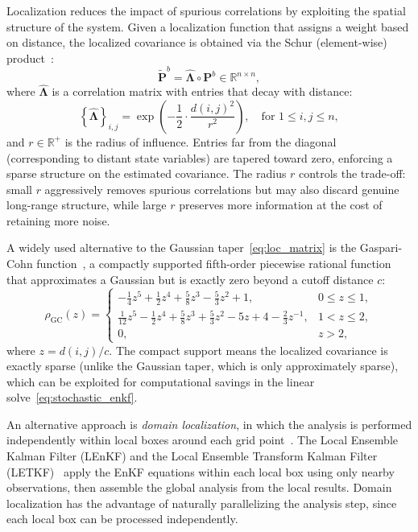 Localization reduces the impact of spurious correlations by exploiting the spatial structure of the system. Given a localization function that assigns a weight based on distance, the localized covariance is obtained via the Schur (element-wise) product~\citep{gaspari1999construction}:
\begin{equation}
\label{eq:localization}
\widetilde{\mathbf{P}}^b = \widehat{\boldsymbol{\Lambda}} \circ \mathbf{P}^b \in \mathbb{R}^{n \times n},
\end{equation}
where $\widehat{\boldsymbol{\Lambda}}$ is a correlation matrix with entries that decay with distance:
\begin{equation}
\label{eq:loc_matrix}
\left\{\widehat{\boldsymbol{\Lambda}}\right\}_{i,j} = \exp\!\left(-\frac{1}{2} \cdot \frac{d(i,j)^2}{r^2}\right), \quad \text{for } 1 \leq i, j \leq n,
\end{equation}
and $r \in \mathbb{R}^+$ is the radius of influence. Entries far from the diagonal (corresponding to distant state variables) are tapered toward zero, enforcing a sparse structure on the estimated covariance. The radius $r$ controls the trade-off: small $r$ aggressively removes spurious correlations but may also discard genuine long-range structure, while large $r$ preserves more information at the cost of retaining more noise.

A widely used alternative to the Gaussian taper~\eqref{eq:loc_matrix} is the Gaspari-Cohn function~\citep{gaspari1999construction}, a compactly supported fifth-order piecewise rational function that approximates a Gaussian but is exactly zero beyond a cutoff distance $c$:
\begin{equation}
\label{eq:gaspari_cohn}
\rho_{\text{GC}}(z) = \begin{cases}
-\frac{1}{4}z^5 + \frac{1}{2}z^4 + \frac{5}{8}z^3 - \frac{5}{3}z^2 + 1, & 0 \leq z \leq 1, \\
\frac{1}{12}z^5 - \frac{1}{2}z^4 + \frac{5}{8}z^3 + \frac{5}{3}z^2 - 5z + 4 - \frac{2}{3}z^{-1}, & 1 < z \leq 2, \\
0, & z > 2,
\end{cases}
\end{equation}
where $z = d(i,j)/c$. The compact support means the localized covariance is exactly sparse (unlike the Gaussian taper, which is only approximately sparse), which can be exploited for computational savings in the linear solve~\eqref{eq:stochastic_enkf}.

An alternative approach is \emph{domain localization}, in which the analysis is performed independently within local boxes around each grid point~\citep{ott2004local}. The Local Ensemble Kalman Filter (LEnKF) and the Local Ensemble Transform Kalman Filter (LETKF)~\citep{hunt2007efficient} apply the EnKF equations within each local box using only nearby observations, then assemble the global analysis from the local results. Domain localization has the advantage of naturally parallelizing the analysis step, since each local box can be processed independently.

